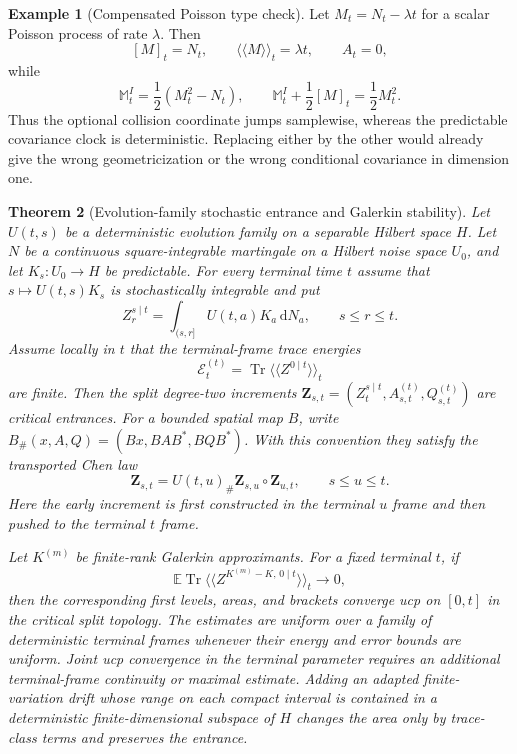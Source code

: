 \documentclass[10pt,reqno]{amsart}
\theoremstyle{plain}
\newtheorem{theorem}{Theorem}[section]
\theoremstyle{definition}
\newtheorem{example}[theorem]{Example}
\theoremstyle{remark}
\begin{document}
\begin{example}[Compensated Poisson type check]
\label{ex:poisson-type-check}
Let $M_t=N_t-\lambda t$ for a scalar Poisson process of rate $\lambda$.
Then
\[
 [M]_t=N_t,\qquad
 \langle\!\langle M\rangle\!\rangle_t=\lambda t,
 \qquad A_t=0,
\]
while
\[
 \mathbb M_t^I=\frac12(M_t^2-N_t),
 \qquad
 \mathbb M_t^I+\frac12[M]_t=\frac12M_t^2.
\]
Thus the optional collision coordinate jumps samplewise, whereas the
predictable covariance clock is deterministic.  Replacing either by the
other would already give the wrong geometricization or the wrong
conditional covariance in dimension one.
\end{example}

\begin{theorem}[Evolution-family stochastic entrance and Galerkin stability]
\label{thm:evolution-spde-interface}
Let $U(t,s)$ be a deterministic evolution family on a separable Hilbert space
$H$.  Let $N$ be a continuous square-integrable martingale on a Hilbert noise
space $U_0$, and let $K_s:U_0\to H$ be predictable.  For every terminal time
$t$ assume that $s\mapsto U(t,s)K_s$ is stochastically integrable and put
\[
 Z_r^{s\mid t}=\int_{(s,r]}U(t,a)K_a\,\mathrm dN_a,
 \qquad s\le r\le t.
\]
Assume locally in $t$ that the terminal-frame trace energies
\[
 \mathcal E_t^{(t)}
 =\operatorname{Tr}\langle\!\langle Z^{0\mid t}\rangle\!\rangle_t
\]
are finite.  Then the split degree-two increments
$\mathbf Z_{s,t}=(Z_t^{s\mid t},A_{s,t}^{(t)},Q_{s,t}^{(t)})$ are critical
entrances.  For a bounded spatial map $B$, write
$B_\#(x,A,Q)=(Bx,BAB^*,BQB^*)$.  With this convention they satisfy the
transported Chen law
\begin{equation}
 \mathbf Z_{s,t}
 =U(t,u)_\#\mathbf Z_{s,u}\circ\mathbf Z_{u,t},
 \qquad s\le u\le t.
 \label{eq:spde-transported-Chen}
\end{equation}
Here the early increment is first constructed in the terminal $u$ frame and
then pushed to the terminal $t$ frame.

Let $K^{(m)}$ be finite-rank Galerkin approximants.  For a fixed terminal
$t$, if
\begin{equation}
 \mathbb E\operatorname{Tr}
 \langle\!\langle
  Z^{K^{(m)}-K,\,0\mid t}
 \rangle\!\rangle_t\longrightarrow0,
 \label{eq:spde-operational-convergence}
\end{equation}
then the corresponding first levels, areas, and brackets converge ucp on
$[0,t]$ in the critical split topology.  The estimates are uniform over a
family of deterministic terminal frames whenever their energy and error
bounds are uniform.  Joint ucp convergence in the terminal parameter requires
an additional terminal-frame continuity or maximal estimate.  Adding an adapted finite-variation drift whose range on each compact
interval is contained in a deterministic finite-dimensional subspace of $H$
changes the area only by trace-class terms and preserves the entrance.
\end{theorem}
\end{document}
